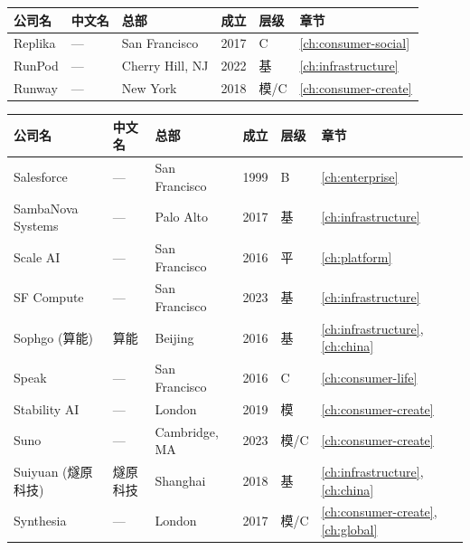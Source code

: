 \nopagebreak
\begin{tabularx}{\textwidth}{@{}l X l l l l@{}}
\toprule
\rowcolor{figLightGray}
\textbf{公司名} & \textbf{中文名} & \textbf{总部} & \textbf{成立} & \textbf{层级} & \textbf{章节} \\
\midrule
Replika             & ---             & San Francisco & 2017 & C    & \ref{ch:consumer-social} \\
RunPod              & ---             & Cherry Hill, NJ & 2022 & 基 & \ref{ch:infrastructure} \\
Runway              & ---             & New York      & 2018 & 模/C & \ref{ch:consumer-create} \\
\bottomrule
\end{tabularx}

\bigskip

\nopagebreak
\begin{tabularx}{\textwidth}{@{}l X l l l l@{}}
\toprule
\rowcolor{figLightGray}
\textbf{公司名} & \textbf{中文名} & \textbf{总部} & \textbf{成立} & \textbf{层级} & \textbf{章节} \\
\midrule
Salesforce          & ---             & San Francisco & 1999 & B    & \ref{ch:enterprise} \\
SambaNova Systems   & ---             & Palo Alto     & 2017 & 基   & \ref{ch:infrastructure} \\
Scale AI            & ---             & San Francisco & 2016 & 平   & \ref{ch:platform} \\
SF Compute          & ---             & San Francisco & 2023 & 基   & \ref{ch:infrastructure} \\
Sophgo (算能)       & 算能            & Beijing       & 2016 & 基   & \ref{ch:infrastructure}, \ref{ch:china} \\
Speak               & ---             & San Francisco & 2016 & C    & \ref{ch:consumer-life} \\
Stability AI        & ---             & London        & 2019 & 模   & \ref{ch:consumer-create} \\
Suno                & ---             & Cambridge, MA & 2023 & 模/C & \ref{ch:consumer-create} \\
Suiyuan (燧原科技)  & 燧原科技        & Shanghai      & 2018 & 基   & \ref{ch:infrastructure}, \ref{ch:china} \\
Synthesia           & ---             & London        & 2017 & 模/C & \ref{ch:consumer-create}, \ref{ch:global} \\
\bottomrule
\end{tabularx}

